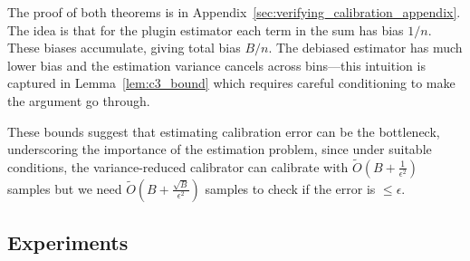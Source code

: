 The proof of both theorems is in Appendix~\ref{sec:verifying_calibration_appendix}. The idea is that for the plugin estimator each term in the sum has bias $1/n$. These biases accumulate, giving total bias $B/n$. The debiased estimator has much lower bias and the estimation variance cancels across bins---this intuition is captured in Lemma~\ref{lem:c3_bound} which requires careful conditioning to make the argument go through.

These bounds suggest that estimating calibration error can be the bottleneck, underscoring the importance of the estimation problem, since under suitable conditions, the variance-reduced calibrator can calibrate with $\widetilde{O}(B + \frac{1}{\epsilon^2})$ samples but we need $\widetilde{O}(B + \frac{\sqrt{B}}{\epsilon^2})$ samples to check if the error is $\leq \epsilon$.

\newcommand{\calset}[0]{\ensuremath{S_C}}
\newcommand{\verifset}[0]{\ensuremath{S_E}}

\subsection{Experiments}


